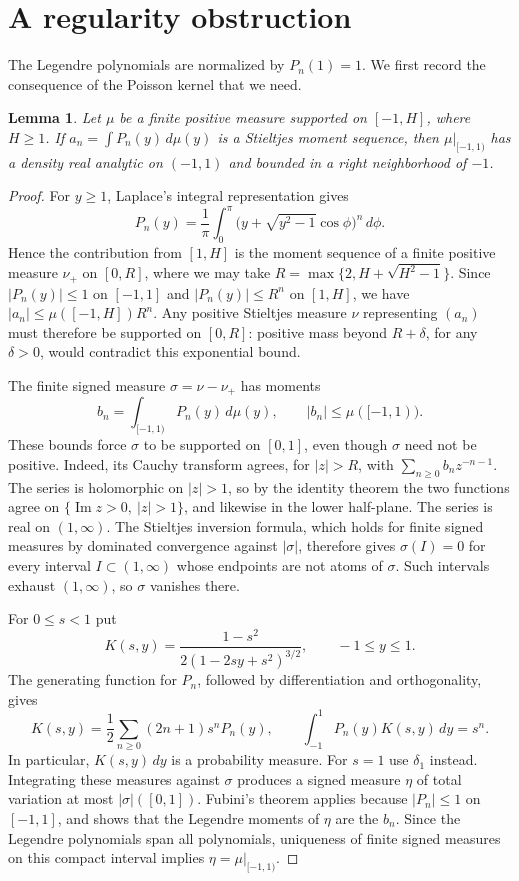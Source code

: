 \documentclass[11pt]{article}
\newtheorem{lemma}[theorem]{Lemma}
\begin{document}
\section{A regularity obstruction}\label{sec:regularity}
The Legendre polynomials are normalized by $P_n(1)=1$.
We first record the consequence of the Poisson kernel that we need.
\begin{lemma}\label{lem:regularity}
Let $\mu$ be a finite positive measure supported on $[-1,H]$, where $H\ge1$.
If $a_n=\int P_n(y)\,d\mu(y)$ is a Stieltjes moment sequence, then
$\mu|_{[-1,1)}$ has a density real analytic on $(-1,1)$ and bounded in a
right neighborhood of $-1$.
\end{lemma}
\begin{proof}
For $y\ge1$, Laplace's integral representation gives
\begin{equation}\label{eq:laplace}
 P_n(y)=\frac1\pi\int_0^\pi
 \bigl(y+\sqrt{y^2-1}\cos\phi\bigr)^n\,d\phi.
\end{equation}
Hence the contribution from $[1,H]$ is the moment sequence of a finite positive
measure $\nu_+$ on $[0,R]$, where we may take
$R=\max\{2,H+\sqrt{H^2-1}\}$.
Since $|P_n(y)|\le1$ on $[-1,1]$ and $|P_n(y)|\le R^n$ on $[1,H]$,
we have $|a_n|\le\mu([-1,H])R^n$.
Any positive Stieltjes measure $\nu$ representing $(a_n)$ must therefore be
supported on $[0,R]$: positive mass beyond $R+\delta$, for any $\delta>0$,
would contradict this exponential bound.

The finite signed measure $\sigma=\nu-\nu_+$ has moments
\begin{equation}\label{eq:bn}
 b_n=\int_{[-1,1)}P_n(y)\,d\mu(y),\qquad |b_n|\le\mu([-1,1)).
\end{equation}
These bounds force $\sigma$ to be supported on $[0,1]$, even though $\sigma$
need not be positive. Indeed, its Cauchy transform agrees, for $|z|>R$, with
$\sum_{n\ge0}b_n z^{-n-1}$. The series is holomorphic on $|z|>1$, so by
the identity theorem the two functions agree on
$\{\operatorname{Im}z>0,\ |z|>1\}$, and likewise in the lower
half-plane. The series is real on $(1,\infty)$.
The Stieltjes inversion formula, which holds for finite signed measures by
dominated convergence against $|\sigma|$, therefore gives $\sigma(I)=0$ for
every interval $I\subset(1,\infty)$ whose endpoints are not atoms of $\sigma$.
Such intervals exhaust $(1,\infty)$, so $\sigma$ vanishes there.

For $0\le s<1$ put
\begin{equation}\label{eq:kernel}
 K(s,y)=\frac{1-s^2}{2(1-2sy+s^2)^{3/2}},\qquad -1\le y\le1.
\end{equation}
The generating function for $P_n$, followed by differentiation and
orthogonality, gives
\[
 K(s,y)=\frac12\sum_{n\ge0}(2n+1)s^nP_n(y),\qquad
 \int_{-1}^1P_n(y)K(s,y)\,dy=s^n.
\]
In particular, $K(s,y)\,dy$ is a probability measure. For $s=1$ use
$\delta_1$ instead. Integrating these measures against $\sigma$ produces a
signed measure $\eta$ of total variation at most $|\sigma|([0,1])$.
Fubini's theorem applies because $|P_n|\le1$ on $[-1,1]$, and shows
that the Legendre moments of $\eta$ are the $b_n$.
Since the Legendre polynomials span all polynomials, uniqueness of finite
signed measures on this compact interval implies
$\eta=\mu|_{[-1,1)}$.


\end{proof}
\end{document}
